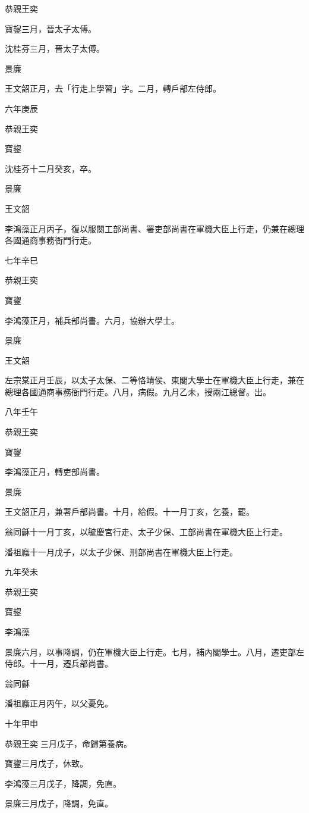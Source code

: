 \begin{pinyinscope}
恭親王奕

寶鋆三月，晉太子太傅。

沈桂芬三月，晉太子太傅。

景廉

王文韶正月，去「行走上學習」字。二月，轉戶部左侍郎。

六年庚辰

恭親王奕

寶鋆

沈桂芬十二月癸亥，卒。

景廉

王文韶

李鴻藻正月丙子，復以服闋工部尚書、署吏部尚書在軍機大臣上行走，仍兼在總理各國通商事務衙門行走。

七年辛巳

恭親王奕

寶鋆

李鴻藻正月，補兵部尚書。六月，協辦大學士。

景廉

王文韶

左宗棠正月壬辰，以太子太保、二等恪靖侯、東閣大學士在軍機大臣上行走，兼在總理各國通商事務衙門行走。八月，病假。九月乙未，授兩江總督。出。

八年壬午

恭親王奕

寶鋆

李鴻藻正月，轉吏部尚書。

景廉

王文韶正月，兼署戶部尚書。十月，給假。十一月丁亥，乞養，罷。

翁同龢十一月丁亥，以毓慶宮行走、太子少保、工部尚書在軍機大臣上行走。

潘祖廕十一月戊子，以太子少保、刑部尚書在軍機大臣上行走。

九年癸未

恭親王奕

寶鋆

李鴻藻

景廉六月，以事降調，仍在軍機大臣上行走。七月，補內閣學士。八月，遷吏部左侍郎。十一月，遷兵部尚書。

翁同龢

潘祖廕正月丙午，以父憂免。

十年甲申

恭親王奕三月戊子，命歸第養病。

寶鋆三月戊子，休致。

李鴻藻三月戊子，降調，免直。

景廉三月戊子，降調，免直。


\end{pinyinscope}

